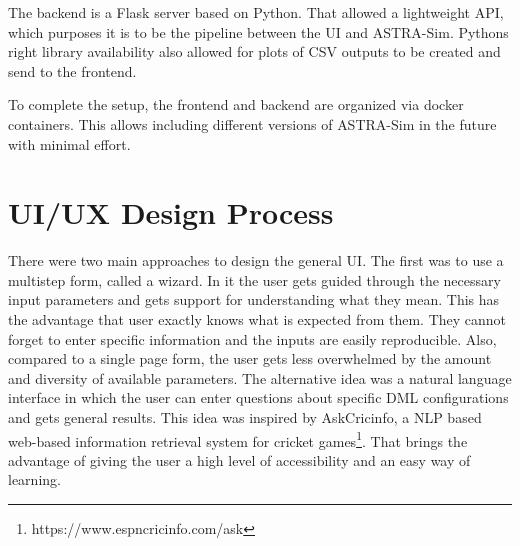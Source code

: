 The backend is a Flask server based on Python. That allowed a lightweight \ac{API}, which purposes it is to be the pipeline between the \ac{UI} and \ac{ASTRA-Sim}. Pythons right library availability also allowed for plots of \ac{CSV} outputs to be created and send to the frontend. 

To complete the setup, the frontend and backend are organized via docker containers. This allows including different versions of \ac{ASTRA-Sim} in the future with minimal effort.




\section{UI/UX Design Process}


There were two main approaches to design the general \ac{UI}.
The first was to use a multistep form, called a wizard. In it the user gets guided through the necessary input parameters and gets support for understanding what they mean. This has the advantage that user exactly knows what is expected from them. They cannot forget to enter specific information and the inputs are easily reproducible. Also, compared to a single page form, the user gets less overwhelmed by the amount and diversity of available parameters.
The alternative idea was a natural language interface in which the user can enter questions about specific \ac{DML} configurations and gets general results. This idea was inspired by AskCricinfo, a \ac{NLP} based web-based information retrieval system for cricket games\footnote{https://www.espncricinfo.com/ask}.
That brings the advantage of giving the user a high level of accessibility and an easy way of learning.

